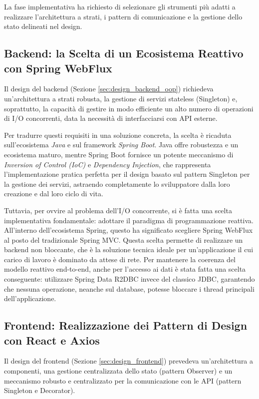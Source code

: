 \documentclass[12pt,a4paper,openright,twoside]{book}
\begin{document}
La fase implementativa ha richiesto di selezionare gli strumenti più adatti a realizzare l'architettura a strati, i pattern di comunicazione e la gestione dello stato delineati nel design.

\subsection{Backend: la Scelta di un Ecosistema Reattivo con Spring WebFlux}
Il design del backend (Sezione \ref{sec:design_backend_oop}) richiedeva un'architettura a strati robusta, la gestione di servizi stateless (Singleton) e, soprattutto, la capacità di gestire in modo efficiente un alto numero di operazioni di I/O concorrenti, data la necessità di interfacciarsi con API esterne.

Per tradurre questi requisiti in una soluzione concreta, la scelta è ricaduta sull'ecosistema \textit{Java} e sul framework \textit{Spring Boot}. Java offre robustezza e un ecosistema maturo, mentre Spring Boot fornisce un potente meccanismo di \textit{Inversion of Control (IoC)} e \textit{Dependency Injection}, che rappresenta l'implementazione pratica perfetta per il design basato sul pattern Singleton per la gestione dei servizi, astraendo completamente lo sviluppatore dalla loro creazione e dal loro ciclo di vita.

Tuttavia, per ovvire al problema dell'I/O concorrente, si è fatta una scelta implementativa fondamentale: adottare il paradigma di programmazione reattiva. All'interno dell'ecosistema Spring, questo ha significato scegliere Spring WebFlux al posto del tradizionale Spring MVC. Questa scelta permette di realizzare un backend non bloccante, che è la soluzione tecnica ideale per un'applicazione il cui carico di lavoro è dominato da attese di rete. Per mantenere la coerenza del modello reattivo end-to-end, anche per l'accesso ai dati è stata fatta una scelta conseguente: utilizzare Spring Data R2DBC invece del classico JDBC, garantendo che nessuna operazione, neanche sul database, potesse bloccare i thread principali dell'applicazione.

\subsection{Frontend: Realizzazione dei Pattern di Design con React e Axios}
Il design del frontend (Sezione \ref{sec:design_frontend}) prevedeva un'architettura a componenti, una gestione centralizzata dello stato (pattern Observer) e un meccanismo robusto e centralizzato per la comunicazione con le API (pattern Singleton e Decorator).
\end{document}

